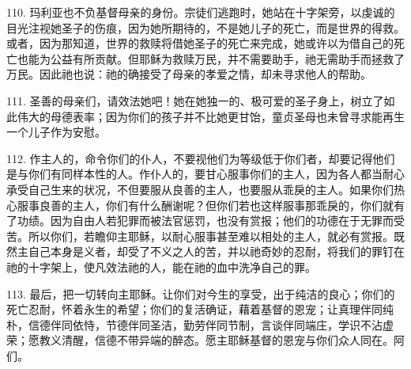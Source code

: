 110. 玛利亚也不负基督母亲的身份。宗徒们逃跑时，她站在十字架旁，以虔诚的目光注视她圣子的伤痕，因为她所期待的，不是她儿子的死亡，而是世界的得救。或者，因为那知道，世界的救赎将借她圣子的死亡来完成，她或许以为借自己的死亡也能为公益有所贡献。但耶稣为救赎万民，并不需要助手，祂无需助手而拯救了万民。因此祂也说：祂的确接受了母亲的孝爱之情，却未寻求他人的帮助。\par

111. 圣善的母亲们，请效法她吧！她在她独一的、极可爱的圣子身上，树立了如此伟大的母德表率；因为你们的孩子并不比她更甘饴，童贞圣母也未曾寻求能再生一个儿子作为安慰。\par

112. 作主人的，命令你们的仆人，不要视他们为等级低于你们者，却要记得他们是与你们有同样本性的人。作仆人的，要甘心服事你们的主人，因为各人都当耐心承受自己生来的状况，不但要服从良善的主人，也要服从乖戾的主人。如果你们热心服事良善的主人，你们有什么酬谢呢？但你们若也这样服事那乖戾的，你们就有了功绩。因为自由人若犯罪而被法官惩罚，也没有赏报；他们的功德在于无罪而受苦。所以你们，若瞻仰主耶稣，以耐心服事甚至难以相处的主人，就必有赏报。既然主自己本身是义者，却受了不义之人的苦，并以祂奇妙的忍耐，将我们的罪钉在祂的十字架上，使凡效法祂的人，能在祂的血中洗净自己的罪。\par

113. 最后，把一切转向主耶稣。让你们对今生的享受，出于纯洁的良心；你们的死亡忍耐，怀着永生的希望；你们的复活确证，藉着基督的恩宠；让真理伴同纯朴，信德伴同依恃，节德伴同圣洁，勤劳伴同节制，言谈伴同端庄，学识不沾虚荣；愿教义清醒，信德不带异端的醉态。愿主耶稣基督的恩宠与你们众人同在。阿们。\par

